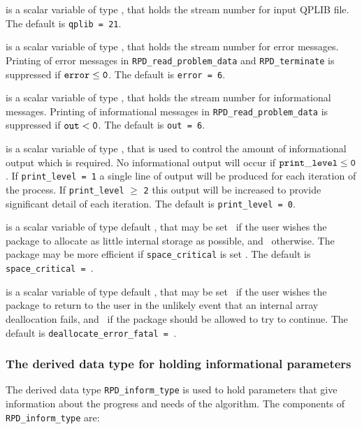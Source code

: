 \documentclass{galahad}
\newcommand{\packagename}{RPD}
\begin{document}
\begin{description}
 is a scalar variable of type \integer, that holds the
stream number for input QPLIB file.
The default is {\tt qplib = 21}.

 is a scalar variable of type \integer, that holds the
stream number for error messages.
Printing of error messages in
{\tt \packagename\_read\_problem\_data} and {\tt \packagename\_terminate}
is suppressed if ${\tt error} \leq {\tt 0}$.
The default is {\tt error = 6}.

 is a scalar variable of type \integer, that holds the
stream number for informational messages.
Printing of informational messages in
{\tt \packagename\_read\_problem\_data} is suppressed if ${\tt out} < {\tt 0}$.
The default is {\tt out = 6}.

 is a scalar variable of type \integer,
that is used
to control the amount of informational output which is required. No
informational output will occur if ${\tt print\_level} \leq {\tt 0}$. If
{\tt print\_level = 1} a single line of output will be produced for each
iteration of the process. If {\tt print\_level} $\geq$ {\tt 2} this output
will be increased to provide significant detail of each iteration.
The default is {\tt print\_level = 0}.

 is a scalar variable of type default \logical, that
may be set \true\ if the user wishes the package to allocate as little
internal storage as possible, and \false\ otherwise. The package may
be more efficient if {\tt space\_critical} is set \false.
The default is {\tt space\_critical = \false}.

 is a scalar variable of type default \logical,
that may be set \true\ if the user wishes the package to return to the user
in the unlikely event that an internal array deallocation fails,
and \false\ if the package should be allowed to try to continue.
The default is {\tt deallocate\_error\_fatal = \false}.

\end{description}


\subsubsection{The derived data type for holding informational
 parameters}\label{typeinform}
The derived data type
{\tt \packagename\_inform\_type}
is used to hold parameters that give information about the progress and needs
of the algorithm. The components of
{\tt \packagename\_inform\_type}
are:
\end{document}
